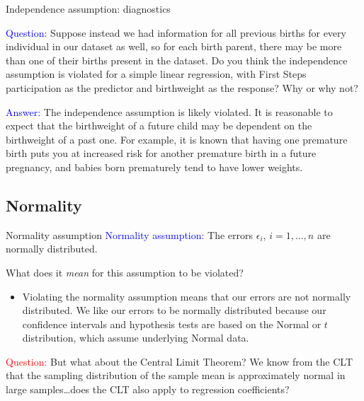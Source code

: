\documentclass[10pt,t]{beamer}
\begin{document}
\begin{frame}{Independence assumption: diagnostics}


\textcolor{blue}{Question:} Suppose instead we had information for all previous births for every individual in our dataset as well, so for each birth parent, there may be more than one of their births present in the dataset. Do you think the independence assumption is violated for a simple linear regression, with First Steps participation as the predictor and birthweight as the response? Why or why not? \pause

\vspace{0.3cm}

\textcolor{blue}{Answer:} The independence assumption is likely violated. It is reasonable to expect that the birthweight of a future child may be dependent on the birthweight of a past one. For example, it is known that having one premature birth puts you at increased risk for another premature birth in a future pregnancy, and babies born prematurely tend to have lower weights. 

\end{frame}

\subsection{Normality}

\begin{frame}{Normality assumption}
\textcolor{blue}{Normality assumption:} The errors $\epsilon_i$, $i = 1, \dots, n$ are normally distributed.

\vspace{0.3cm}

What does it \textit{mean} for this assumption to be violated?

\vspace{0.3cm}

\begin{itemize}
	\item[] Violating the normality assumption means that our errors are not normally distributed. We like our errors to be normally distributed because our confidence intervals and hypothesis tests are based on the Normal or $t$ distribution, which assume underlying Normal data. \pause
\end{itemize}

\vspace{0.3cm} 
\textcolor{red}{Question:} But what about the Central Limit Theorem? We know from the CLT that the sampling distribution of the sample mean is approximately normal in large samples\dots does the CLT also apply to regression coefficients?

\end{frame}
\end{document}

